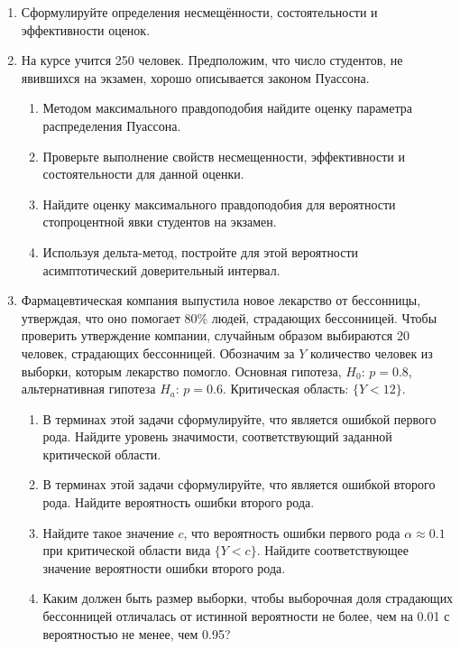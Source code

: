 \documentclass[12pt, a4paper]{article}\usepackage[]{graphicx}\usepackage[]{color}
\begin{document}
						\begin{enumerate}
							\item	Сформулируйте определения несмещённости, состоятельности и эффективности оценок.

							\item На курсе учится 250 человек. Предположим, что число студентов, не явившихся на экзамен, хорошо описывается законом Пуассона.
							\begin{enumerate}
								\item	Методом максимального правдоподобия найдите оценку параметра распределения Пуассона.
								\item	Проверьте выполнение свойств несмещенности, эффективности и состоятельности для данной оценки.
								\item	Найдите оценку максимального правдоподобия для вероятности стопроцентной явки студентов на экзамен.
								\item	Используя дельта-метод, постройте для этой вероятности асимптотический доверительный интервал.
							\end{enumerate}

							\item	Фармацевтическая компания выпустила новое лекарство от бессонницы, утверждая, что оно помогает 80\% людей, страдающих бессонницей. Чтобы проверить утверждение компании, случайным образом выбираются 20 человек, страдающих бессонницей. Обозначим за $Y$ количество человек из выборки, которым лекарство помогло. Основная гипотеза, $H_0$: $p=0.8$, альтернативная гипотеза $H_a$: $p=0.6$. Критическая область: $\{Y<12\}$.
							\begin{enumerate}
								\item	В терминах этой задачи сформулируйте, что является ошибкой первого рода.
								Найдите уровень значимости, соответствующий заданной критической области.
								\item	В терминах этой задачи сформулируйте, что является ошибкой второго рода.
								Найдите вероятность ошибки второго рода.
								\item	Найдите такое значение $c$, что вероятность ошибки первого рода $\alpha \approx 0.1$ при критической области вида $\{Y<c\}$. Найдите соответствующее значение вероятности ошибки второго рода.
								\item	Каким должен быть размер выборки, чтобы выборочная доля страдающих бессонницей отличалась от истинной вероятности не более, чем на 0.01 с вероятностью не менее, чем 0.95?
							\end{enumerate}


\end{enumerate}
\end{document}
